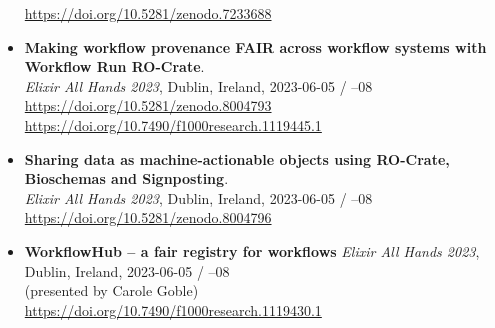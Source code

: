 \begin{itemize}
    \url{https://doi.org/10.5281/zenodo.7233688}
  \item
    \textbf{Making workflow provenance FAIR across workflow systems with
    Workflow Run RO-Crate}.\\
    \emph{Elixir All Hands 2023}, Dublin, Ireland, 2023-06-05 / --08\\
    \url{https://doi.org/10.5281/zenodo.8004793}~\\
    \url{https://doi.org/10.7490/f1000research.1119445.1}
  \item
    \textbf{Sharing data as machine-actionable objects using RO-Crate,
    Bioschemas and Signposting}.\\
    \emph{Elixir All Hands 2023}, Dublin, Ireland, 2023-06-05 / --08\\
    \url{https://doi.org/10.5281/zenodo.8004796}
  \item
    \textbf{WorkflowHub -- a fair registry for workflows} \emph{Elixir All
    Hands 2023}, Dublin, Ireland, 2023-06-05 / --08\\
    (presented by Carole Goble)\\
    \url{https://doi.org/10.7490/f1000research.1119430.1}
\end{itemize}
  
